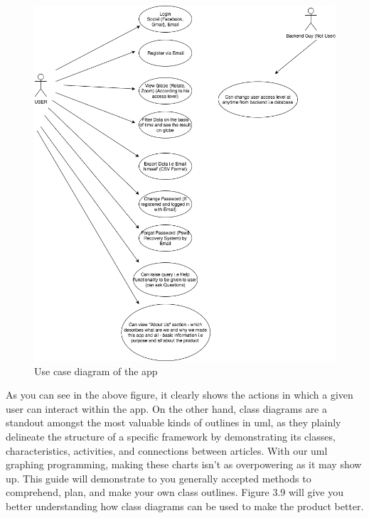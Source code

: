     \begin{figure}[H]
            \centering
            \includegraphics[width=1.0\linewidth]{figures/ch3/usecase.png}
            \caption{\label{fig:use_case} Use case diagram of the app}
    \end{figure}

As you can see in the above figure, it clearly shows the actions in which a given user can interact within the app. On the other hand, class diagrams are a standout amongst the most valuable kinds of outlines in \gls{uml}, as they plainly delineate the structure of a specific framework by demonstrating its classes, characteristics, activities, and connections between articles. With our  \gls{uml} graphing programming, making these charts isn't as overpowering as it may show up. This guide will demonstrate to you generally accepted methods to comprehend, plan, and make your own class outlines. Figure 3.9 will give you better understanding how class diagrams can be used to make the product better.

